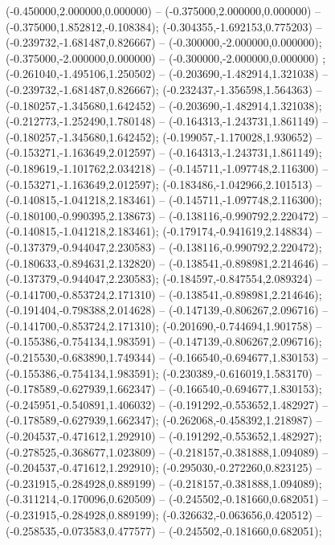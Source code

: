  (-0.450000,2.000000,0.000000) -- (-0.375000,2.000000,0.000000) -- (-0.375000,1.852812,-0.108384);
 (-0.304355,-1.692153,0.775203) -- (-0.239732,-1.681487,0.826667) -- (-0.300000,-2.000000,0.000000);
 (-0.375000,-2.000000,0.000000) -- (-0.300000,-2.000000,0.000000) ;
 (-0.261040,-1.495106,1.250502) -- (-0.203690,-1.482914,1.321038) -- (-0.239732,-1.681487,0.826667);
 (-0.232437,-1.356598,1.564363) -- (-0.180257,-1.345680,1.642452) -- (-0.203690,-1.482914,1.321038);
 (-0.212773,-1.252490,1.780148) -- (-0.164313,-1.243731,1.861149) -- (-0.180257,-1.345680,1.642452);
 (-0.199057,-1.170028,1.930652) -- (-0.153271,-1.163649,2.012597) -- (-0.164313,-1.243731,1.861149);
 (-0.189619,-1.101762,2.034218) -- (-0.145711,-1.097748,2.116300) -- (-0.153271,-1.163649,2.012597);
 (-0.183486,-1.042966,2.101513) -- (-0.140815,-1.041218,2.183461) -- (-0.145711,-1.097748,2.116300);
 (-0.180100,-0.990395,2.138673) -- (-0.138116,-0.990792,2.220472) -- (-0.140815,-1.041218,2.183461);
 (-0.179174,-0.941619,2.148834) -- (-0.137379,-0.944047,2.230583) -- (-0.138116,-0.990792,2.220472);
 (-0.180633,-0.894631,2.132820) -- (-0.138541,-0.898981,2.214646) -- (-0.137379,-0.944047,2.230583);
 (-0.184597,-0.847554,2.089324) -- (-0.141700,-0.853724,2.171310) -- (-0.138541,-0.898981,2.214646);
 (-0.191404,-0.798388,2.014628) -- (-0.147139,-0.806267,2.096716) -- (-0.141700,-0.853724,2.171310);
 (-0.201690,-0.744694,1.901758) -- (-0.155386,-0.754134,1.983591) -- (-0.147139,-0.806267,2.096716);
 (-0.215530,-0.683890,1.749344) -- (-0.166540,-0.694677,1.830153) -- (-0.155386,-0.754134,1.983591);
 (-0.230389,-0.616019,1.583170) -- (-0.178589,-0.627939,1.662347) -- (-0.166540,-0.694677,1.830153);
 (-0.245951,-0.540891,1.406032) -- (-0.191292,-0.553652,1.482927) -- (-0.178589,-0.627939,1.662347);
 (-0.262068,-0.458392,1.218987) -- (-0.204537,-0.471612,1.292910) -- (-0.191292,-0.553652,1.482927);
 (-0.278525,-0.368677,1.023809) -- (-0.218157,-0.381888,1.094089) -- (-0.204537,-0.471612,1.292910);
 (-0.295030,-0.272260,0.823125) -- (-0.231915,-0.284928,0.889199) -- (-0.218157,-0.381888,1.094089);
 (-0.311214,-0.170096,0.620509) -- (-0.245502,-0.181660,0.682051) -- (-0.231915,-0.284928,0.889199);
 (-0.326632,-0.063656,0.420512) -- (-0.258535,-0.073583,0.477577) -- (-0.245502,-0.181660,0.682051);
